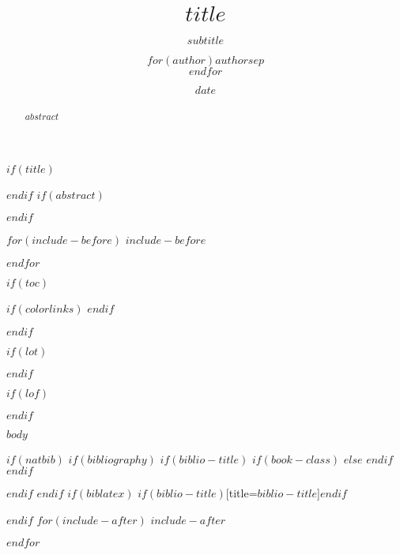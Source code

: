 \documentclass[doctor,twoside,chapterhead,otf]{znufethesis}
\title{\LARGE\textbf{$title$}}
\title{}
\subtitle{$subtitle$}
\author{$for(author)$$author$$sep$ \\ $endfor$}
\author{}
\date{$date$}
\date{}
\begin{document}
$if(title)$
\maketitle
$endif$
$if(abstract)$
\begin{abstract}
$abstract$
\end{abstract}
$endif$


\mainmatter
\pagestyle{mpage}

$for(include-before)$
$include-before$

$endfor$

$if(toc)$
{
$if(colorlinks)$
\hypersetup{linkcolor=$if(toccolor)$$toccolor$$else$black$endif$}
$endif$

\setcounter{tocdepth}{$toc-depth$}
\cleardoublepage
{} %
\tableofcontents        %
}
$endif$

$if(lot)$
\cleardoublepage
{} %
\listoftables           %
$endif$

$if(lof)$
\cleardoublepage
{} %
\listoffigures          %
$endif$


$body$

$if(natbib)$
$if(bibliography)$
$if(biblio-title)$
$if(book-class)$
\renewcommand\bibname{$biblio-title$}
$else$
\renewcommand\refname{$biblio-title$}
$endif$
$endif$


$endif$
$endif$
$if(biblatex)$
\printbibliography$if(biblio-title)$[title=$biblio-title$]$endif$

$endif$
$for(include-after)$
$include-after$

$endfor$
\end{document}
